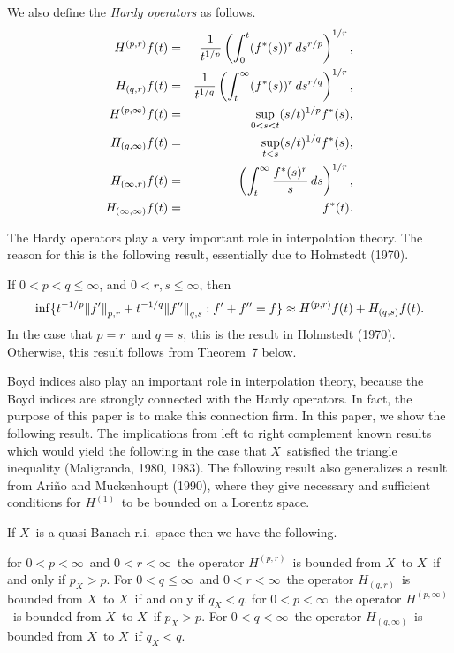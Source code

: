 We also define the {\it Hardy operators\/} as follows.
\begin{eqnarray*}
   H^{(p,r)} f(t) &=& 
   {1\over t^{1/p}} \left(\int_0^t (f^*(s))^r \, ds^{r/p} \right)^{1/r} ,\\
   H_{(q,r)} f(t) &=& 
   {1\over t^{1/q}}\left(\int_t^\infty (f^*(s))^r \, ds^{r/q}
   \right)^{1/r} ,\\
   H^{(p,\infty)} f(t) &=& 
   \sup_{0<s<t} (s/t)^{1/p} f^*(s) ,\\
   H_{(q,\infty)} f(t) &=& 
   \sup_{t<s} (s/t)^{1/q} f^*(s) ,\\
   H_{(\infty,r)} f(t)     &=& \left(\int_t^\infty {f^*(s)^r \over s} \, ds
   \right)^{1/r} ,\\
   H_{(\infty,\infty)} f(t) &=& f^*(t) .
\end{eqnarray*}

The Hardy operators play a very important role in interpolation theory.
The reason for this is the following result, essentially due to 
Holmstedt (1970).

  If $0 < p < q \le \infty$, and
$0<r,s \le \infty$, then
$$ \inf\{ t^{-1/p} {\mathopen\| f' \mathclose\|}_{p,r} + t^{-1/q} {\mathopen\| f'' \mathclose\|}_{q,s} : 
   f' + f'' = f\}
   \approx
       H^{(p,r)} f(t) + H_{(q,s)} f(t)  . $$
\endproclaim
\proof In the case that $p=r$\ and $q=s$, this is the result in
Holmstedt (1970).  Otherwise, this result follows from Theorem~7 below.
\endproof

Boyd indices also play an important role in interpolation theory, because
the Boyd indices are strongly connected with the Hardy operators.  In fact,
the purpose of this paper is to make this connection firm.  In this
paper, we show the following result.  
The implications from left to right complement known results which would
yield the following in the case that 
$X$\ satisfied the triangle inequality (Maligranda, 1980, 1983).
The following result also generalizes a result from 
Ari\~no and Muckenhoupt (1990), where
they give necessary
and sufficient conditions for $H^{(1)}$\ to be bounded on a Lorentz
space.

  If $X$\ is a quasi-Banach r.i.\
space then we have the following.
\begin{itemlist}
\itemi for $0<p<\infty$\ and $0<r<\infty$\ the operator
$H^{(p,r)}$\ is bounded from $X$\ to $X$\ if and only if $p_X>p$.
\itemii For $0<q\le \infty$\ and $0<r<\infty$\ the operator
$H_{(q,r)}$\ is bounded from $X$\ to $X$\ if and only if $q_X<q$.
\itemiii for $0<p<\infty$\ the operator
$H^{(p,\infty)}$\ is bounded from $X$\ to $X$\ if $p_X>p$.
\itemiv For $0<q<\infty$\ the operator
$H_{(q,\infty)}$\ is bounded from $X$\ to $X$\ if $q_X<q$.
\end{itemlist}
\endproclaim

